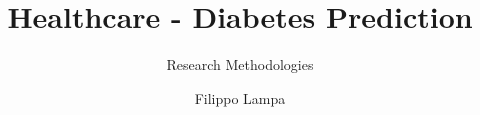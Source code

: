 \documentclass{unicam_thesis}
\title{Healthcare - Diabetes Prediction}
\subtitle{Research Methodologies}
\author{Filippo Lampa}%
\begin{document}
\maketitle



\tableofcontents
\lstlistoflistings
\listoffigures
\listoftables




%
%
%



%
\end{document}
